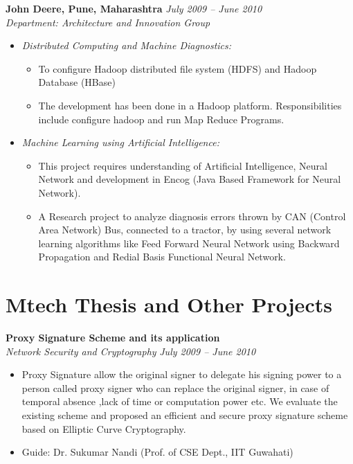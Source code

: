 \documentclass[margin,line]{resume}
\begin{document}
\begin{resume}
    \textbf{John Deere, Pune, Maharashtra }\hfill \textsl{July 2009 -- June 2010}\vspace{0mm}\\\vspace{0mm}%
    \textsl{Department: Architecture and Innovation Group} 
     \begin{itemize}
     \item \textsl{Distributed Computing and Machine Diagnostics:} 
            \begin{itemize}
             \item To configure Hadoop distributed file system (HDFS) and Hadoop Database (HBase)
             \item The development has been done in a Hadoop platform. Responsibilities include configure hadoop and run Map Reduce Programs.
             \end{itemize}
     \item \textsl{Machine Learning using Artificial Intelligence:}
             \begin{itemize}
              \item This project requires understanding of Artificial Intelligence, Neural Network and development in Encog (Java Based Framework for Neural Network).
	       \item A Research project to analyze diagnosis errors thrown by CAN (Control Area  Network) Bus,
   connected to a tractor, by using several network learning algorithms like Feed Forward Neural Network using Backward Propagation and Redial Basis Functional Neural Network.
               \end{itemize}
      \end{itemize}
    \section{\mysidestyle Mtech Thesis and Other Projects}

    \textbf{Proxy Signature Scheme and its application}\vspace{0mm}\\\vspace{0mm}%
    \textsl{Network Security and Cryptography}  \hfill \textsl{July 2009 -- June 2010}
       \begin{itemize}
	\item Proxy Signature allow the original signer to delegate his signing power to a person 
         called proxy signer  who can replace the original signer, in case of temporal absence ,lack of time or computation power etc.
        We evaluate the existing scheme and proposed an efficient and secure proxy signature scheme based on Elliptic Curve 
        Cryptography. 
	\item Guide: Dr. Sukumar Nandi (Prof. of CSE Dept., IIT Guwahati)
       \end{itemize}
       

\end{resume}
\end{document}
